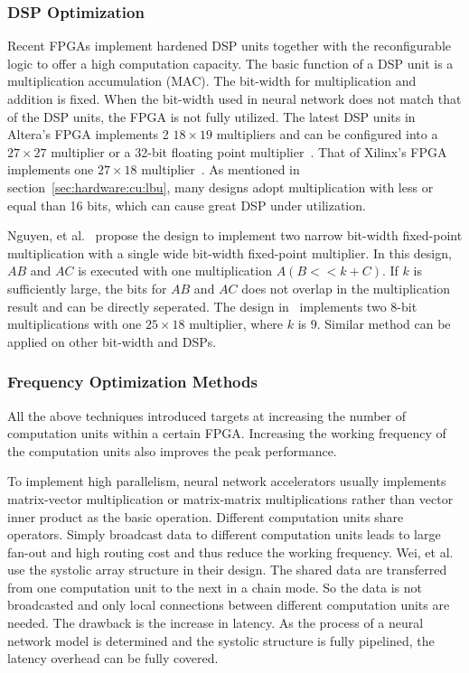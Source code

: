 \subsubsection{DSP Optimization}
Recent FPGAs implement hardened DSP units together with the reconfigurable logic to offer a high computation capacity. The basic function of a DSP unit is a multiplication accumulation (MAC). The bit-width for multiplication and addition is fixed. When the bit-width used in neural network does not match that of the DSP units, the FPGA is not fully utilized. The latest DSP units in Altera's FPGA implements 2 $18\times 19$ multipliers and can be configured into a $27\times 27$ multiplier or a 32-bit floating point multiplier~\cite{altera_dsp}. That of Xilinx's FPGA implements one $27\times 18$ multiplier~\cite{xilinx_dsp}. As mentioned in section~\ref{sec:hardware:cu:lbu}, many designs adopt multiplication with less or equal than 16 bits, which can cause great DSP under utilization.

Nguyen, et al.~\cite{nguyen2017double} propose the design to implement two narrow bit-width fixed-point multiplication with a single wide bit-width fixed-point multiplier. In this design, $AB$ and $AC$ is executed with one multiplication $A(B<<k+C)$. If $k$ is sufficiently large, the bits for $AB$ and $AC$ does not overlap in the multiplication result and can be directly seperated. The design in~\cite{nguyen2017double} implements two 8-bit multiplications with one $25\times 18$ multiplier, where $k$ is 9. Similar method can be applied on other bit-width and DSPs.

\subsubsection{Frequency Optimization Methods}
All the above techniques introduced targets at increasing the number of computation units within a certain FPGA. Increasing the working frequency of the computation units also improves the peak performance.

To implement high parallelism, neural network accelerators usually implements matrix-vector multiplication or matrix-matrix multiplications rather than vector inner product as the basic operation. Different computation units share operators. Simply broadcast data to different computation units leads to large fan-out and high routing cost and thus reduce the working frequency. Wei, et al.~\cite{wei2017automated} use the systolic array structure in their design. The shared data are transferred from one computation unit to the next in a chain mode. So the data is not broadcasted and only local connections between different computation units are needed. The drawback is the increase in latency. As the process of a neural network model is determined and the systolic structure is fully pipelined, the latency overhead can be fully covered.

